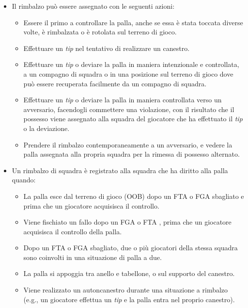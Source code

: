 \begin{itemize}

    \item Il rimbalzo può essere assegnato con le seguenti azioni:

        \begin{itemize}
            \item Essere il primo a controllare la palla, anche se essa è stata toccata diverse volte, è rimbalzata o è rotolata sul terreno di gioco.
            \item Effettuare un \textit{tip} nel tentativo di realizzare un canestro.
            \item Effettuare un \textit{tip} o deviare la palla in maniera intenzionale e controllata, a un compagno di squadra o in una posizione sul terreno di gioco dove può essere recuperata facilmente da un compagno di squadra.
            \item Effettuare un \textit{tip} o deviare la palla in maniera controllata verso un avversario, facendogli commettere una violazione, con il risultato che il possesso viene assegnato alla squadra del giocatore che ha effettuato il \textit{tip} o la deviazione.
            \item Prendere il rimbalzo contemporaneamente a un avversario, e vedere la palla assegnata alla propria squadra per la rimessa di possesso alternato.
        \end{itemize}

    \item Un rimbalzo di squadra è registrato alla squadra che ha diritto alla palla quando:

        \begin{itemize}
            \item La palla esce dal terreno di gioco (OOB) dopo un FTA o FGA sbagliato e prima che un giocatore acquisisca il controllo.
            \item Viene fischiato un fallo dopo un FGA o FTA , prima che un giocatore acquisisca il controllo della palla.
            \item Dopo un FTA o FGA sbagliato, due o più giocatori della stessa squadra sono coinvolti in una situazione di palla a due.
            \item La palla si appoggia tra anello e tabellone, o sul supporto del canestro.
            \item Viene realizzato un autoncanestro durante una situazione a rimbalzo (e.g., un giocatore effettua un \textit{tip} e la palla entra nel proprio canestro).
        \end{itemize}


\end{itemize}
